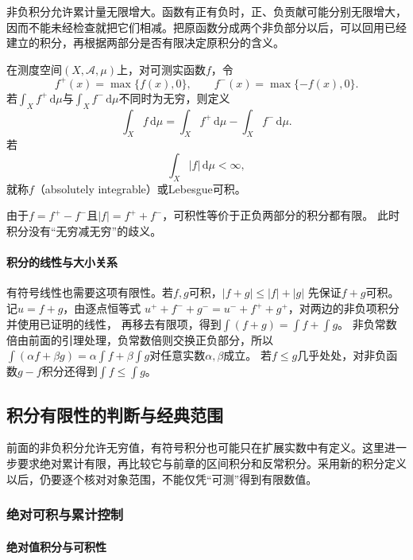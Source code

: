 非负积分允许累计量无限增大。函数有正有负时，正、负贡献可能分别无限增大，因而不能未经检查就把它们相减。把原函数分成两个非负部分以后，可以回用已经建立的积分，再根据两部分是否有限决定原积分的含义。
\begin{definition}[有符号积分与可积性]
\label{def:analysis-integrable-function}
在测度空间$(X,\mathcal{A},\mu)$上，对可测实函数$f$，令
\[   f^+(x)=\max\{f(x),0\},\qquad   f^-(x)=\max\{-f(x),0\}. \]
若$\int_X f^+\,\mathrm{d}\mu$与$\int_X f^-\,\mathrm{d}\mu$不同时为无穷，则定义
\[
  \int_X f\,\mathrm{d}\mu
  =\int_X f^+\,\mathrm{d}\mu-\int_X f^-\,\mathrm{d}\mu.
\]
若
\begin{equation}
  \int_X|f|\,\mathrm{d}\mu<\infty,
\label{eq:analysis-absolute-integrability}
\end{equation}
就称$f$（absolutely integrable）或Lebesgue可积。
\end{definition}
由于$f=f^+-f^-$且$|f|=f^++f^-$，可积性等价于正负两部分的积分都有限。
此时积分没有“无穷减无穷”的歧义。

\paragraph{积分的线性与大小关系}

有符号线性也需要这项有限性。若$f,g$可积，$|f+g|\leq|f|+|g|$
先保证$f+g$可积。记$u=f+g$，由逐点恒等式
$u^++f^-+g^-=u^-+f^++g^+$，对两边的非负项积分并使用已证明的线性，
再移去有限项，得到$\int(f+g)=\int f+\int g$。
非负常数倍由前面的引理处理，负常数倍则交换正负部分，所以
$\int(\alpha f+\beta g)=\alpha\int f+\beta\int g$对任意实数$\alpha,\beta$成立。
若$f\leq g$几乎处处，对非负函数$g-f$积分还得到$\int f\leq\int g$。

\subsection{积分有限性的判断与经典范围}

前面的非负积分允许无穷值，有符号积分也可能只在扩展实数中有定义。这里进一步要求绝对累计有限，再比较它与前章的区间积分和反常积分。采用新的积分定义以后，仍要逐个核对对象范围，不能仅凭“可测”得到有限数值。

\subsubsection{绝对可积与累计控制}
\paragraph{绝对值积分与可积性}

